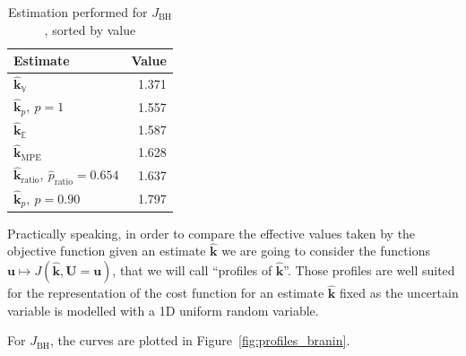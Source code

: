 \documentclass[preprint, 1p]{elsarticle}
\newcommand{\Ex}{\mathbb{E}}
\newcommand{\hatkmean}{\hat{\mathbf{k}}_{\Ex}}
\newcommand{\hatkvar}{\hat{\mathbf{k}}_{\mathbb{V}}}
\newcommand{\hatkmpe}{\hat{\mathbf{k}}_{\mathrm{MPE}}}
\newcommand{\kest}{\hat{\mathbf{k}}}
\newcommand{\JBH}{J_{\mathrm{BH}}}
\begin{document}
\begin{table}[!h]
  \centering
\caption{Estimation performed for $\JBH$, sorted by value}
\begin{tabular}{lr}
  \toprule
Estimate & Value \\ \midrule
$\hatkvar$ & 1.371 \\ 
$\kest_{p},~p=1$ & 1.557 \\ 
$\hatkmean$ & 1.587 \\ 
$\kest_{\mathrm{MPE}}$ & 1.628 \\ 
$\kest_{\mathrm{ratio}},~\hat{p}_{\mathrm{ratio}}=0.654$ & 1.637 \\ 
$\kest_p,~p=0.90$ & 1.797 \\  \bottomrule
\end{tabular}
\label{tab:recap_estimates_branin}
\end{table}
Practically speaking, in order to compare the effective values taken by the objective function given an estimate $\kest$ we are going to consider the functions $\mathbf{u} \mapsto J(\kest,\mathbf{U}=\mathbf{u})$, that we will call ``profiles of $\kest$''. Those profiles are well suited for the representation of the cost function for an estimate $\kest$ fixed as the uncertain variable is modelled with a 1D uniform random variable.

For $\JBH$, the curves are plotted in Figure~\ref{fig:profiles_branin}.
\end{document}
